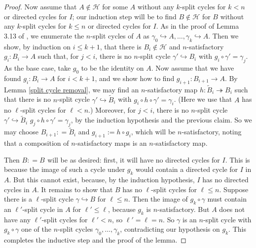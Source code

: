 \documentclass{amsart}
\theoremstyle{definition}
\theoremstyle{remark}
\numberwithin{equation}{section}
\begin{document}
\begin{proof}
Now assume that $A \notin \mathcal{H}$ for some $A$ without any $k$-split cycles for $k < n$ or directed cycles for $I$; our induction step will be to find $B \notin \mathcal{H}$ for $B$ without any $k$-split cycles for $k \leq n$ or directed cycles for $I$. As in the proof of Lemma 3.13 of \cite{ApproxOrder}, we enumerate the $n$-split cycles of $A$ as $\gamma_0 \hookrightarrow A, \ldots, \gamma_k \hookrightarrow A$. Then we show, by induction on $i \leq k+1$, that there is $B_i \notin \mathcal{H}$ and $n$-satisfactory $g_i: B_i \to A$ such that, for $j < i$, there is no $n$-split cycle $\gamma' \hookrightarrow B_i$ with $g_i \circ \gamma' = \gamma_j$. As the base case, take $g_0$ to be the identity on $A$. Now assume that we have found $g_{i}: B_i \to A$ for $i < k+1$, and we show how to find $g_{i+1}: B_{i+1} \to A$.  By Lemma \ref{split cycle removal}, we may find an $n$-satisfactory map $h: \tilde{B}_{i} \twoheadrightarrow B_i$ such that there is no $n$-split cycle $\gamma' \hookrightarrow \tilde{B}_{i}$ with $g_i \circ h \circ \gamma' = \gamma_i$. (Here we use that $A$ has no $\ell$-split cycles for $\ell < n$.)  Moreover, for $j < i$, there is no $n$-split cycle $\gamma' \hookrightarrow \tilde{B}_{i}$  $  g_j \circ h  \circ \gamma' = \gamma_j$, by the induction hypothesis and the previous claim. So we may choose $B_{i+1} : =  \tilde{B}_{i}$ and $g_{i+1} := h \circ g_i $, which will be $n$-satisfactory, noting that a composition of $n$-satisfactory maps is an $n$-satisfactory map.


Then $B : = B_{}$ will be as desired: first, it will have no directed cycles for $I$. This is because the image of such a cycle under $g_{k}$ would contain a directed cycle for $I$ in $A$. But this cannot exist, because, by the induction hypothesis, $I$ has no directed cycles in $A$. It remains to show that $B$ has no $\ell$-split cycles for $\ell \leq n$. Suppose there is a $\ell$-split cycle $\gamma \hookrightarrow B$ for $\ell \leq n$. Then the image of $g_{k} \circ \gamma$ must contain an $\ell'$-split cycle in $A$ for $\ell' \leq \ell$, because $g_{k}$ is $n$-satisfactory. But $A$ does not have any $\ell'$-split cycles for $\ell' < n$, so $\ell' = \ell = n$. So $\gamma$ is an $n$-split cycle with $g_{k} \circ \gamma$ one of the $n$-split cycles $\gamma_0, \ldots, \gamma_k$, contradicting our hypothesis on $g_k$. This completes the inductive step and the proof of the lemma.




\end{proof}
\end{document}
